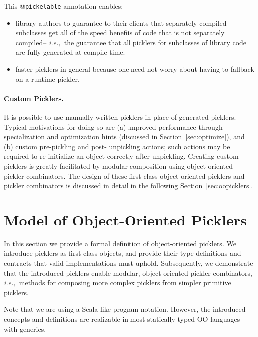 \documentclass[preprint,10pt]{sigplanconf}
\theoremstyle{definition}
\newcommand{\ie}{{\em i.e.,~}}
\newcommand{\term}[1]{\mbox{\texttt{#1}}}
\begin{document}
This \term{$@$pickelable} annotation enables:

\begin{itemize}
\item library authors to guarantee to their clients that separately-compiled
subclasses get all of the speed benefits of code that is not separately
compiled-- \ie the guarantee that all picklers for subclasses of library code
are fully generated at compile-time.

\item faster picklers in general because one need not worry about having to
fallback on a runtime pickler.
\end{itemize}

\paragraph{Custom Picklers.} It is possible to use manually-written picklers
in place of generated picklers. Typical motivations for doing so are (a)
improved performance through specialization and optimization hints (discussed
in Section~\ref{sec:optimize}), and (b) custom pre-pickling and post-
unpickling actions; such actions may be required to re-initialize an object
correctly after unpickling. Creating custom picklers is greatly facilitated by
modular composition using object-oriented pickler combinators. The design of
these first-class object-oriented picklers and pickler combinators is
discussed in detail in the following Section~\ref{sec:oopicklers}.


\section{Model of Object-Oriented Picklers}

In this section we provide a formal definition of object-oriented picklers. We
introduce picklers as first-class objects, and provide their type definitions
and contracts that valid implementations must uphold. Subsequently, we
demonstrate that the introduced picklers enable modular, object-oriented
pickler combinators, \ie methods for composing more complex picklers from
simpler primitive picklers.

Note that we are using a Scala-like program notation. However, the introduced
concepts and definitions are realizable in most statically-typed OO languages
with generics.
\end{document}
